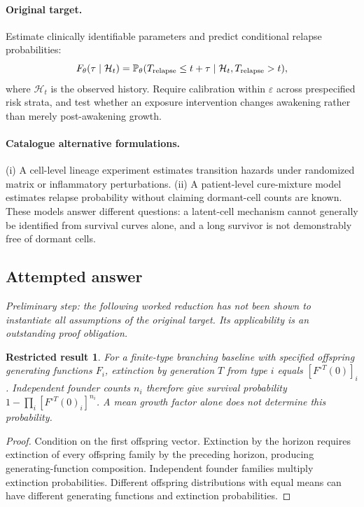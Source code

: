 \documentclass[11pt]{article}
\newcommand{\Prob}{\mathbb P}
\providecommand{\Prob}{\mathbb P}
\newtheorem{attemptresult}{Restricted result}[section]
\begin{document}
\paragraph{Original target.}
Estimate clinically identifiable parameters and predict conditional relapse probabilities:
\[
F_\theta(\tau\mid\mathcal H_t)=
\Prob_\theta(T_{\rm relapse}\leq t+\tau\mid\mathcal H_t,T_{\rm relapse}>t),
\]
where $\mathcal H_t$ is the observed history. Require calibration within $\varepsilon$ across prespecified risk strata, and test whether an exposure intervention changes awakening rather than merely post-awakening growth.
\paragraph{Catalogue alternative formulations.}
(i) A cell-level lineage experiment estimates transition hazards under randomized matrix or inflammatory perturbations. (ii) A patient-level cure-mixture model estimates relapse probability without claiming dormant-cell counts are known. These models answer different questions: a latent-cell mechanism cannot generally be identified from survival curves alone, and a long survivor is not demonstrably free of dormant cells.
\subsection{Attempted answer}
\noindent\emph{Preliminary step: the following worked reduction has not been shown to instantiate all assumptions of the original target. Its applicability is an outstanding proof obligation.}

\begin{attemptresult}
For a finite-type branching baseline with specified offspring generating functions $F_i$, extinction by generation $T$ from type $i$ equals $[F^{\circ T}(0)]_i$. Independent founder counts $n_i$ therefore give survival probability $1-\prod_i[F^{\circ T}(0)_i]^{n_i}$. A mean growth factor alone does not determine this probability.
\end{attemptresult}
\begin{proof}
Condition on the first offspring vector. Extinction by the horizon requires extinction of every offspring family by the preceding horizon, producing generating-function composition. Independent founder families multiply extinction probabilities. Different offspring distributions with equal means can have different generating functions and extinction probabilities.
\end{proof}
\end{document}
